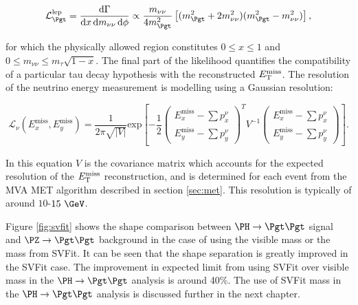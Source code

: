 \begin{equation}
\mathcal{L}_{\Pgt}^{\text{lep}} =
\frac{\text{d}\Gamma}{\text{d}x\,\text{d}m_{\nu\nu}\,\text{d}\phi} \propto
\frac{m_{\nu\nu}}{4m_{\Pgt}^{2}}\left[(m_{\Pgt}^{2}+2m_{\nu\nu}^{2})(m_{\Pgt}^{2}-m_{\nu\nu}^{2})\right],
\end{equation}

for which the physically allowed region constitutes $0 \leq x \leq 1$ and $0
\leq m_{\nu\nu} \leq m_{\tau}\sqrt{1-x}$. The final part of the likelihood
quantifies the compatibility of a particular tau decay hypothesis with the
reconstructed $E_{\mathrm{T}}^{\text{miss}}$. The resolution of the neutrino energy measurement is
modelling using a Gaussian resolution:

\begin{equation}
\mathcal{L}_{\nu}(E_{x}^{\text{miss}},E_{y}^{\text{miss}}) =
\frac{1}{2\pi\sqrt{|V|}}\text{exp}\left[
-\frac{1}{2}\begin{pmatrix}E_{x}^{\text{miss}}-\sum p_{x}^{\nu} \\
E_{y}^{\text{miss}}-\sum p_{y}^{\nu}\end{pmatrix}^{T} V^{-1}
\begin{pmatrix}E_{x}^{\text{miss}}-\sum p_{x}^{\nu} \\ E_{y}^{\text{miss}}-\sum
p_{y}^{\nu}\end{pmatrix}\right].
\end{equation}

In this equation $V$ is the covariance matrix which accounts for the expected
resolution of the $E_{\mathrm{T}}^{\text{miss}}$ reconstruction, and is determined for each event from
the MVA MET algorithm described in section \ref{sec:met}. This resolution is
typically of around $10$-$15~\GeV$. 

Figure \ref{fig:svfit} shows the shape comparison between $\PH\to\Pgt\Pgt$ signal
and $\PZ \to \Pgt\Pgt$ background in the case of using the visible mass or the mass from SVFit. It can
be seen that the shape separation is greatly improved in the SVFit case.
The improvement in expected limit from using SVFit over visible mass in the $\PH
\to \Pgt\Pgt$ analysis is around 40$\%$. The use of SVFit mass in the
$\PH\to\Pgt\Pgt$ analysis is discussed further in the next chapter.

